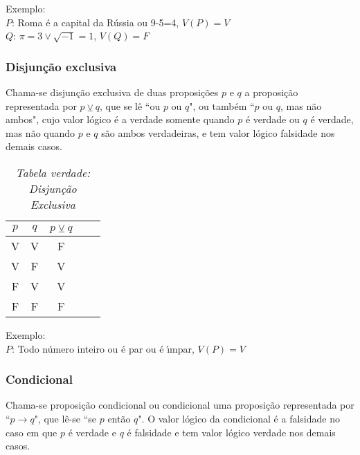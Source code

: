 Exemplo:\\
\textbf{$P$}: Roma {\'e} a capital da R{\'u}ssia ou 9-5=4, $V(P)=V$\\
\textbf{$Q$}: $\pi=3\vee\sqrt{-1}=1$, $V(Q)=F$

\subsubsection{Disjun{\c c}{\~a}o exclusiva}
\begin{definicao} Chama-se disjun{\c c}{\~a}o exclusiva de duas proposi{\c c}{\~o}es $p$ e $q$ a proposi{\c c}{\~a}o representada por $p\veebar q$, que se l{\^e} ``ou $p$ ou $q$", ou tamb{\'e}m ``$p$ ou $q$, mas n{\~a}o ambos", cujo valor l{\'o}gico {\'e} a verdade somente quando $p$ {\'e} verdade ou $q$ {\'e} verdade, mas n{\~a}o quando $p$ e $q$ s{\~a}o ambos verdadeiras, e tem valor l{\'o}gico falsidade nos demais casos.\end{definicao}
\begin{table}[h]
   \centering 
   \setlength{\arrayrulewidth}{0,5\arrayrulewidth}
   \caption{\it Tabela verdade: Disjun{\c c}{\~a}o Exclusiva}
   \begin{tabular}{|c|c|c|c|c|} 
      \hline
      $p$ & $q$ & $p\veebar q$ \\
     \hline
      V & V & F \\
      \hline
      V & F & V \\
      \hline
      F & V & V \\
      \hline
      F & F & F \\
      \hline
   \end{tabular}
\end{table}

Exemplo:\\
\textbf{$P$}: Todo n{\'u}mero inteiro ou {\'e} par ou {\'e} {\'\i}mpar, $V(P)=V$

\subsubsection{Condicional}
\begin{definicao}[Condicional] Chama-se proposi{\c c}{\~a}o condicional ou condicional uma proposi{\c c}{\~a}o representada por ``$p\rightarrow q$", que l{\^e}-se ``se $p$ ent{\~a}o $q$". O valor l{\'o}gico da condicional {\'e} a falsidade no caso em que $p$ {\'e} verdade e $q$ {\'e} falsidade e tem valor l{\'o}gico verdade nos demais casos.\end{definicao}

